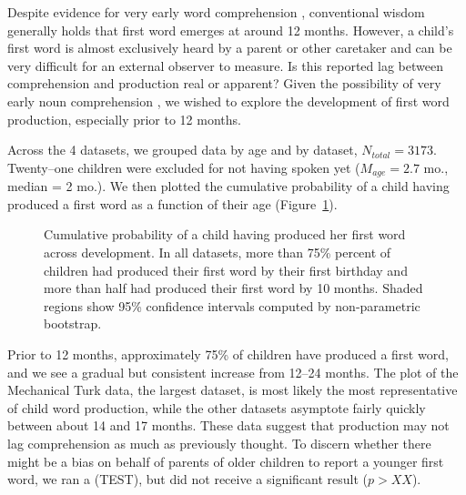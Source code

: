 \documentclass[10pt,letterpaper]{article}
\begin{document}
Despite evidence for very early word comprehension \cite{tincoff1999,tincoff2012,bergelson2012}, conventional wisdom generally holds that first word emerges at around 12 months. However, a child's first word is almost exclusively heard by a parent or other caretaker and can be very difficult for an external observer to measure. Is this reported lag between comprehension and production real or apparent?  Given the possibility of very early noun comprehension \cite{tincoff1999,tincoff2012,bergelson2012}, we wished to explore the development of first word production, especially prior to 12 months.

Across the 4 datasets, we grouped data by age and by dataset, $N_{total} = 3173$. Twenty--one children were excluded for not having spoken yet ($M_{age} = 2.7$ mo., median = 2 mo.). We then plotted the cumulative probability of a child having produced a first word as a function of their age (Figure~\ref{fig:cdfs}).

\begin{figure}[t]
\caption{\label{fig:cdfs} Cumulative probability of a child having produced her first word across development. In all datasets, more than 75\% percent of children had produced their first word by their first birthday and more than half had produced their first word by 10 months.  Shaded regions show 95\% confidence intervals computed by non-parametric bootstrap.}
\end{figure}

Prior to 12 months, approximately 75\% of children have produced a first word, and we see a gradual but consistent increase from 12--24 months. The plot of the Mechanical Turk data, the largest dataset, is most likely the most representative of child word production, while the other datasets asymptote fairly quickly between about 14 and 17 months. These data suggest that production may not lag comprehension as much as previously thought. To discern whether there might be a bias on behalf of parents of older children to report a younger first word, we ran a (TEST), but did not receive a significant result ($p > XX$).
\end{document}
